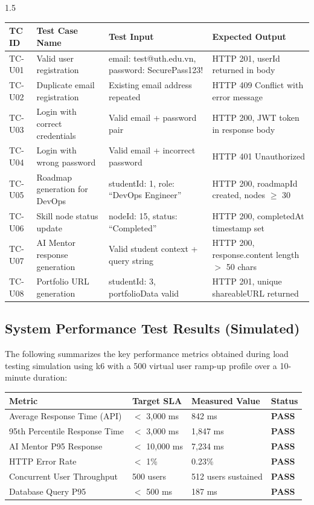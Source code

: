 \documentclass[12pt,a4paper]{report}
\begin{document}
\begin{spacing}{1.5}
		\begin{longtable}{|p{1.5cm}|p{4cm}|p{4.5cm}|p{5cm}|}
			\hline
			\rowcolor{gray!20}\textbf{TC ID} & \textbf{Test Case Name} & \textbf{Test Input} & \textbf{Expected Output} \\ \hline
			TC-U01 & Valid user registration & email: test@uth.edu.vn, password: SecurePass123! & HTTP 201, userId returned in body \\ \hline
			TC-U02 & Duplicate email registration & Existing email address repeated & HTTP 409 Conflict with error message \\ \hline
			TC-U03 & Login with correct credentials & Valid email + password pair & HTTP 200, JWT token in response body \\ \hline
			TC-U04 & Login with wrong password & Valid email + incorrect password & HTTP 401 Unauthorized \\ \hline
			TC-U05 & Roadmap generation for DevOps & studentId: 1, role: ``DevOps Engineer'' & HTTP 200, roadmapId created, nodes $\geq$ 30 \\ \hline
			TC-U06 & Skill node status update & nodeId: 15, status: ``Completed'' & HTTP 200, completedAt timestamp set \\ \hline
			TC-U07 & AI Mentor response generation & Valid student context + query string & HTTP 200, response.content length $>$ 50 chars \\ \hline
			TC-U08 & Portfolio URL generation & studentId: 3, portfolioData valid & HTTP 201, unique shareableURL returned \\ \hline
		\end{longtable}
		
		\subsection{System Performance Test Results (Simulated)}
		
		The following summarizes the key performance metrics obtained during load testing simulation using k6 with a 500 virtual user ramp-up profile over a 10-minute duration:
		
		\begin{longtable}{|p{5cm}|p{3cm}|p{3cm}|p{4cm}|}
			\hline
			\rowcolor{gray!20}\textbf{Metric} & \textbf{Target SLA} & \textbf{Measured Value} & \textbf{Status} \\ \hline
			Average Response Time (API) & $<$ 3,000 ms & 842 ms & \textbf{\color{accentgreen}PASS} \\ \hline
			95th Percentile Response Time & $<$ 3,000 ms & 1,847 ms & \textbf{\color{accentgreen}PASS} \\ \hline
			AI Mentor P95 Response & $<$ 10,000 ms & 7,234 ms & \textbf{\color{accentgreen}PASS} \\ \hline
			HTTP Error Rate & $<$ 1\% & 0.23\% & \textbf{\color{accentgreen}PASS} \\ \hline
			Concurrent User Throughput & 500 users & 512 users sustained & \textbf{\color{accentgreen}PASS} \\ \hline
			Database Query P95 & $<$ 500 ms & 187 ms & \textbf{\color{accentgreen}PASS} \\ \hline
		\end{longtable}
		

\end{spacing}
\end{document}
